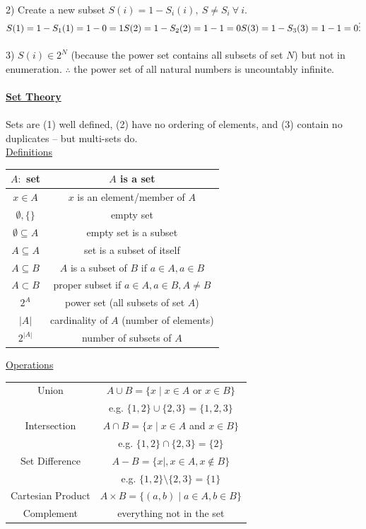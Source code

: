 \documentclass[8pt,letterpaper,twocolumn]{article}
\begin{document}
2) Create a new subset $S(i) = 1-S_i(i), \: S \neq S_i \: \forall \: i$.\\
$S(1) = 1 - S_1(1) = 1 - 0 = 1\\
S(2) = 1 - S_2(2) = 1 - 1 = 0\\
S(3) = 1 - S_3(3) = 1 - 1 = 0\\
\vdots$\\
\\
3) $S(i) \in 2^N$ (because the power set contains all subsets of set $N$) but not in enumeration.
$\therefore$ the power set of all natural numbers is uncountably infinite.\\
\\
\underline{\textbf{Set Theory}}\\
\\
Sets are (1) well defined, (2) have no ordering of elements, and (3) contain no duplicates -- but
multi-sets do.\\
\underline{Definitions}
\begin{tabular}{|c|c|}
\hline 
$A :$ set & $A$ is a set \\ 
\hline 
$x \in A$ & $x$ is an element/member of $A$ \\ 
\hline
$\emptyset, \{\}$ & empty set\\
\hline 
$\emptyset \subseteq A$ & empty set is a subset \\
\hline
$A \subseteq A$ & set is a subset of itself \\
\hline
$A \subseteq B$ & $A$ is a subset of $B$ if $a \in A, a \in B$ \\
$A \subset B$ & proper subset if $a \in A, a \in B, A \neq B$ \\
\hline
$2^A$ & power set (all subsets of set $A$) \\
\hline
$\left|A\right|$ & cardinality of $A$ (number of elements) \\
\hline
$2^{|A|}$ & number of subsets of $A$\\
\hline
\end{tabular}
\underline{Operations}
\begin{tabular}{|c|c|}
\hline
Union & $A \cup B = \{x \mid x \in A$ or $x \in B \}$ \\
& e.g. $\{1,2\} \cup \{2,3\} = \{1,2,3\}$ \\
\hline
Intersection & $A \cap B = \{x \mid x \in A$ and $x \in B\}$ \\
& e.g. $\{1,2\} \cap \{2,3\} = \{2\}$ \\
\hline
Set Difference & $A - B = \{x \mid, x \in A, x \notin B\}$ \\
& e.g. $\{1,2\} \setminus \{2,3\} = \{1\}$ \\
\hline
Cartesian Product & $A \times B = \{(a,b) \mid a \in A, b \in B\}$ \\
\hline
Complement & everything not in the set \\
\hline
\end{tabular}
\end{document}
